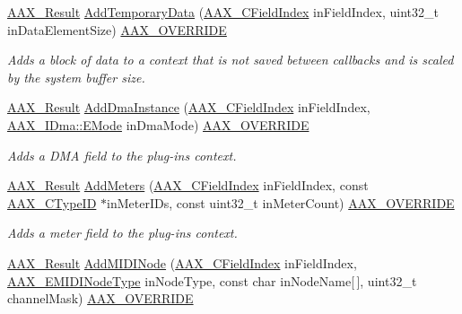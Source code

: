 \begin{DoxyCompactItemize}
\mbox{\hyperlink{a00392_a4d8f69a697df7f70c3a8e9b8ee130d2f}{A\+A\+X\+\_\+\+Result}} \mbox{\hyperlink{a01901_a995b721918e80f51283d461e0d185c76}{Add\+Temporary\+Data}} (\mbox{\hyperlink{a00392_ae807f8986143820cfb5d6da32165c9c7}{A\+A\+X\+\_\+\+C\+Field\+Index}} in\+Field\+Index, uint32\+\_\+t in\+Data\+Element\+Size) \mbox{\hyperlink{a00392_ac2f24a5172689ae684344abdcce55463}{A\+A\+X\+\_\+\+O\+V\+E\+R\+R\+I\+DE}}
\begin{DoxyCompactList}\small\item\em Adds a block of data to a context that is not saved between callbacks and is scaled by the system buffer size. \end{DoxyCompactList}\item 
\mbox{\hyperlink{a00392_a4d8f69a697df7f70c3a8e9b8ee130d2f}{A\+A\+X\+\_\+\+Result}} \mbox{\hyperlink{a01901_ac6663697038ae02344ac541f79d261e0}{Add\+Dma\+Instance}} (\mbox{\hyperlink{a00392_ae807f8986143820cfb5d6da32165c9c7}{A\+A\+X\+\_\+\+C\+Field\+Index}} in\+Field\+Index, \mbox{\hyperlink{a01809_af8d0f19f2896dd6dbd126b919b24e39b}{A\+A\+X\+\_\+\+I\+Dma\+::\+E\+Mode}} in\+Dma\+Mode) \mbox{\hyperlink{a00392_ac2f24a5172689ae684344abdcce55463}{A\+A\+X\+\_\+\+O\+V\+E\+R\+R\+I\+DE}}
\begin{DoxyCompactList}\small\item\em Adds a D\+MA field to the plug-\/in\textquotesingle{}s context. \end{DoxyCompactList}\item 
\mbox{\hyperlink{a00392_a4d8f69a697df7f70c3a8e9b8ee130d2f}{A\+A\+X\+\_\+\+Result}} \mbox{\hyperlink{a01901_acf2c5e733819e4261f3a69e71f0c3795}{Add\+Meters}} (\mbox{\hyperlink{a00392_ae807f8986143820cfb5d6da32165c9c7}{A\+A\+X\+\_\+\+C\+Field\+Index}} in\+Field\+Index, const \mbox{\hyperlink{a00392_ac678f9c1fbcc26315d209f71a147a175}{A\+A\+X\+\_\+\+C\+Type\+ID}} $\ast$in\+Meter\+I\+Ds, const uint32\+\_\+t in\+Meter\+Count) \mbox{\hyperlink{a00392_ac2f24a5172689ae684344abdcce55463}{A\+A\+X\+\_\+\+O\+V\+E\+R\+R\+I\+DE}}
\begin{DoxyCompactList}\small\item\em Adds a meter field to the plug-\/in\textquotesingle{}s context. \end{DoxyCompactList}\item 
\mbox{\hyperlink{a00392_a4d8f69a697df7f70c3a8e9b8ee130d2f}{A\+A\+X\+\_\+\+Result}} \mbox{\hyperlink{a01901_a14eb1a2cc13f8c4672ae9fb7be6a8d72}{Add\+M\+I\+D\+I\+Node}} (\mbox{\hyperlink{a00392_ae807f8986143820cfb5d6da32165c9c7}{A\+A\+X\+\_\+\+C\+Field\+Index}} in\+Field\+Index, \mbox{\hyperlink{a00491_a5e1dffce35d05990dbbad651702678e4}{A\+A\+X\+\_\+\+E\+M\+I\+D\+I\+Node\+Type}} in\+Node\+Type, const char in\+Node\+Name\mbox{[}$\,$\mbox{]}, uint32\+\_\+t channel\+Mask) \mbox{\hyperlink{a00392_ac2f24a5172689ae684344abdcce55463}{A\+A\+X\+\_\+\+O\+V\+E\+R\+R\+I\+DE}}

\end{DoxyCompactItemize}
